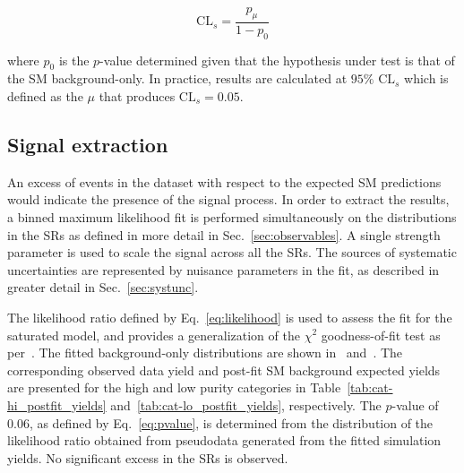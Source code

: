 \begin{equation}
  \textrm{CL}_{s} = \frac{p_\mu}{1-p_0}
  \label{eq:CLs}
\end{equation} 

where $p_{0}$ is the $p$-value determined given that the hypothesis under test is that of the SM background-only. In practice, results are calculated at $95\%$ $\textrm{CL}_s$ which is defined as the $\mu$ that produces $\textrm{CL}_s=0.05$.

\subsection{Signal extraction}
\label{subsec:signal}

An excess of events in the dataset with respect to the expected SM predictions would indicate the presence of the \ttDM signal process. In order to extract the results, a binned maximum likelihood fit is performed simultaneously on the \ptmiss distributions in the SRs as defined in more detail in Sec.~\ref{sec:observables}. A single strength parameter is used to scale the signal across all the SRs. The sources of systematic uncertainties are represented by nuisance parameters in the fit, as described in greater detail in Sec.~\ref{sec:systunc}.

The likelihood ratio defined by Eq.~\ref{eq:likelihood} is used to assess the fit for the saturated model, and provides a generalization of the $\chi^2$ goodness-of-fit test as per~\cite{BAKER1984437}. The fitted background-only \ptmiss distributions are shown in~ and~. The corresponding observed data yield and post-fit SM background expected yields are presented for the high and low purity categories in Table~\ref{tab:cat-hi_postfit_yields} and~\ref{tab:cat-lo_postfit_yields}, respectively. The $p$-value of 0.06, as defined by Eq.~\ref{eq:pvalue}, is determined from the distribution of the likelihood ratio obtained from pseudodata generated from the fitted simulation yields. No significant excess in the SRs is observed. 

